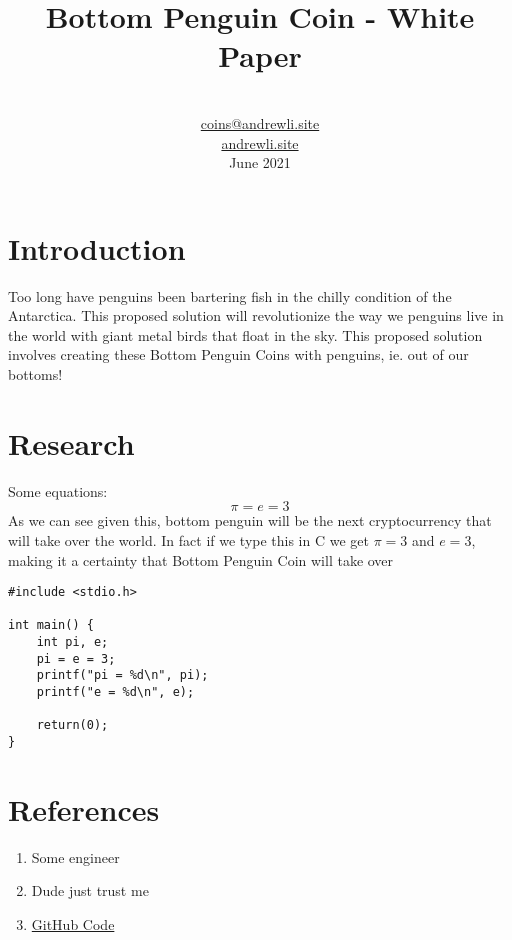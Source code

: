 \documentclass[12pt, titlepage]{article}
\title{Bottom Penguin Coin - White Paper}
\author{\\\href{mailto:coins@andrewli.site}{coins@andrewli.site}\\\href{https://andrewli.site/}{andrewli.site}\\June 2021}
\date{}
\begin{document}
\maketitle

\section{Introduction}
Too long have penguins been bartering fish in the chilly condition of the Antarctica. This proposed solution will revolutionize the way we penguins live in the world with giant metal birds that float in the sky. This proposed solution involves creating these Bottom Penguin Coins with penguins, ie. out of our bottoms! 

\section{Research}
Some equations:
$$
\pi = e = 3
$$
As we can see given this, bottom penguin will be the next cryptocurrency that will take over the world. In fact if we type this in C we get $\pi = 3$ and $e = 3$, making it a certainty that Bottom Penguin Coin will take over
\begin{verbatim}
#include <stdio.h>

int main() {
    int pi, e;
    pi = e = 3;
    printf("pi = %d\n", pi);
    printf("e = %d\n", e);
    
    return(0);
}
\end{verbatim}
\newpage

\section{References}
\begin{enumerate}
  \item Some engineer
  \item Dude just trust me
  \item \href{https://github.com/Zeyu-Li/bottom-penguin}{GitHub Code}
\end{enumerate}
\end{document}
